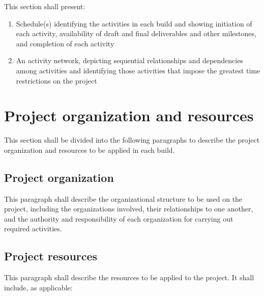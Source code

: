 \documentclass{fidata-report-template}
\begin{document}
This section shall present:

\begin{enumerate}
\itemsep1pt\parskip0pt
\item
  Schedule(s) identifying the activities in each build and showing
  initiation of each activity, availability of draft and final
  deliverables and other milestones, and completion of each activity
\item
  An activity network, depicting sequential relationships and
  dependencies among activities and identifying those activities that
  impose the greatest time restrictions on the project
\end{enumerate}

\section{Project organization and resources}

This section shall be divided into the following paragraphs to describe
the project organization and resources to be applied in each build.

\subsection{Project organization}

This paragraph shall describe the organizational structure to be used on
the project, including the organizations involved, their relationships
to one another, and the authority and responsibility of each
organization for carrying out required activities.

\subsection{Project resources}

This paragraph shall describe the resources to be applied to the
project. It shall include, as applicable:
\end{document}
